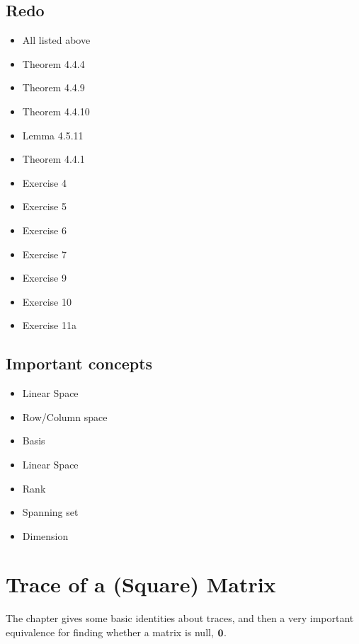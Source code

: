\documentclass[a4paper, oneside]{book}
\begin{document}
\section{Redo}
\begin{itemize}
\item All listed above
\item Theorem 4.4.4
\item Theorem 4.4.9
\item Theorem 4.4.10
\item Lemma 4.5.11
\item Theorem 4.4.1
\item Exercise 4
\item Exercise 5
\item Exercise 6
\item Exercise 7
\item Exercise 9
\item Exercise 10
\item Exercise 11a
\end{itemize}

\section{Important concepts}
\begin{itemize}
\item Linear Space
\item Row/Column space
\item Basis
\item Linear Space
\item Rank
\item Spanning set
\item Dimension
\end{itemize}


\chapter{Trace of a (Square) Matrix}

The chapter gives some basic identities about traces, and then a very important equivalence for finding whether a matrix is null, $\mathbf{0}$.
\end{document}
